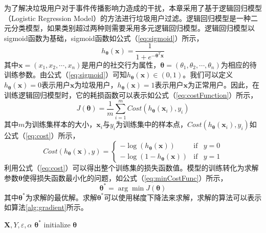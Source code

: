 为了解决垃圾用户对于事件传播影响力造成的干扰，本章采用了基于逻辑回归模型（Logistic Regression Model）的方法进行垃圾用户过滤。逻辑回归模型是一种二元分类模型，如果类别超过两种则需要采用多元逻辑回归模型。逻辑回归模型以sigmoid函数为基础，sigmoid函数如公式（\ref{eq:sigmoid}）所示，
\begin{equation}
\label{eq:sigmoid}
	h_ {\bm{\theta}} \left(\mathbf{x}\right) = \frac{1}{1 + e^{-{{\bm{\theta}}^T}\mathbf{x}}}
\end{equation}
其中$\mathbf{x}=\left({x_1},{x_2},\cdots,{x_n}\right)$是用户的社交行为属性，$\bm{\theta}=\left({\theta _1},{\theta _2},\cdots,{\theta _n}\right)$为相应的待训练参数。由公式（\ref{eq:sigmoid}）可知$h_ {\bm{\theta}} \left(\mathbf{x}\right) \in \left(0,1\right)$。我们可以定义$h_ {\bm{\theta}} \left(\mathbf{x}\right) = 0$表示用户$\mathbf{x}$为垃圾用户，$h_ {\bm{\theta}} \left(\mathbf{x}\right) = 1$表示用户$\mathbf{x}$为正常用户。因此，在训练逻辑回归模型时，它的耗损函数可以表示如公式（\ref{eq:costFunction}）所示，
\begin{equation}
\label{eq:costFunction}
	J\left(\bm{\theta}\right) = \frac{1}{m}\sum_{i=1}^m {Cost\left( h_ {\bm{\theta}}\left(\mathbf{x}_i\right), y_i\right)}
\end{equation}
其中$m$为训练集样本的大小，$\mathbf{x}_i$与$y_i$为训练集中的样本点，$Cost\left( h_ {\bm{\theta}}\left(\mathbf{x}_i\right), y_i\right)$如公式（\ref{eq:cost}）所示，
\begin{equation}
\label{eq:cost}
	Cost\left( h_ {\bm{\theta}}\left(\mathbf{x}\right), y\right) = \left\{ \begin{array}{rcl} -\log \left(h_ {\bm{\theta}} \left(\mathbf{x}\right)\right) & \mbox{if} & y=0 \\ -\log \left(1 - h_ {\bm{\theta}} \left(\mathbf{x}\right) \right) & \mbox{if} & y=1  \end{array} \right.
\end{equation}
利用公式（\ref{eq:cost}）可以得出整个训练集的损失函数值。模型的训练转化为求解参数$\bm{\theta}$使得损失函数最小化的问题，如公式（\ref{eq:minCostFunc}）所示，
\begin{equation}
\label{eq:minCostFunc}
	\bm{\theta}^{\ast} = \arg\min{J\left(\bm{\theta}\right)}
\end{equation}
其中$\bm{\theta}^{\ast}$为求解的最优解。求解$\bm{\theta}^{\ast}$可以使用梯度下降法来求解，求解的算法可以表示如算法\ref{alg:gradient}所示。
\begin{algorithm}[!ht]
	\caption{$Gradient(\mathbf{X},Y)$}
	\label{alg:gradient}
	\begin{algorithmic}[1]
	\REQUIRE $\mathbf{X},Y,\varepsilon,\alpha$
	\ENSURE $\bm{\theta}^{\ast}$
	\STATE initialize $\bm{\theta}$
	\ENDWHILE
    \end{algorithmic}
\end{algorithm}

